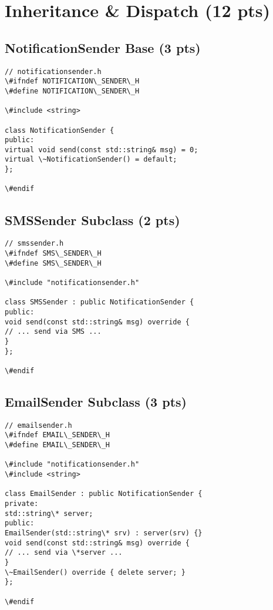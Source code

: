 \documentclass[12pt]{article}
\begin{document}
\section{Inheritance \&  Dispatch (12 pts)}
\subsection{NotificationSender Base (3 pts)}
\begin{lstlisting}
// notificationsender.h
\#ifndef NOTIFICATION\_SENDER\_H
\#define NOTIFICATION\_SENDER\_H

\#include <string>

class NotificationSender {
public:
virtual void send(const std::string& msg) = 0;
virtual \~NotificationSender() = default;
};

\#endif
\end{lstlisting}

\subsection{SMSSender Subclass (2 pts)}
\begin{lstlisting}
// smssender.h
\#ifndef SMS\_SENDER\_H
\#define SMS\_SENDER\_H

\#include "notificationsender.h"

class SMSSender : public NotificationSender {
public:
void send(const std::string& msg) override {
// ... send via SMS ...
}
};

\#endif
\end{lstlisting}

\subsection{EmailSender Subclass (3 pts)}
\begin{lstlisting}
// emailsender.h
\#ifndef EMAIL\_SENDER\_H
\#define EMAIL\_SENDER\_H

\#include "notificationsender.h"
\#include <string>

class EmailSender : public NotificationSender {
private:
std::string\* server;
public:
EmailSender(std::string\* srv) : server(srv) {}
void send(const std::string& msg) override {
// ... send via \*server ...
}
\~EmailSender() override { delete server; }
};

\#endif
\end{lstlisting}
\end{document}
